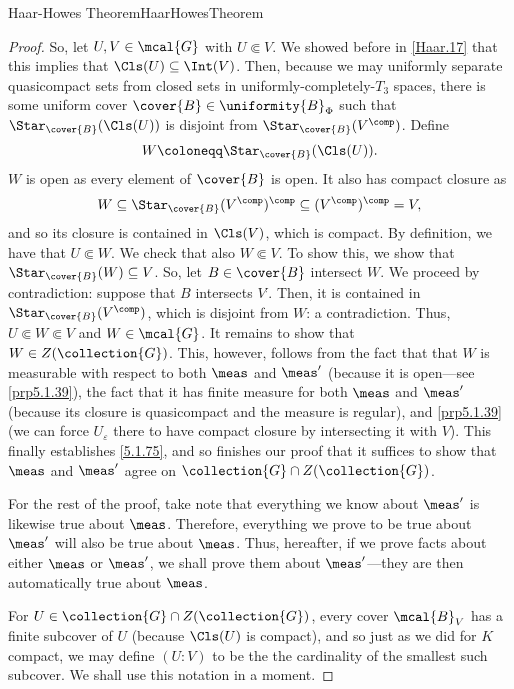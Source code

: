 \begin{thm}{Haar-Howes Theorem}{HaarHowesTheorem}
\begin{proof}
So, let $U,V\in \mcal{G}$ with $U\Subset V$.  We showed before in \cref{Haar.17} that this implies that $\Cls (U)\subseteq \Int (V)$.  Then, because we may uniformly separate quasicompact sets from closed sets in uniformly-completely-$T_3$ spaces, there is some uniform cover $\cover{B}\in \uniformity{B}_{\Phi}$ such that $\Star _{\cover{B}}(\Cls (U))$ is disjoint from $\Star _{\cover{B}}(V^{\comp})$.  Define
\begin{equation}
W\coloneqq \Star _{\cover{B}}(\Cls (U)).
\end{equation}
$W$ is open as every element of $\cover{B}$ is open.  It also has compact closure as
\begin{equation}
W\subseteq \Star _{\cover{B}}(V^{\comp})^{\comp}\subseteq (V^{\comp})^{\comp}=V,
\end{equation}
and so its closure is contained in $\Cls (V)$, which is compact.  By definition, we have that $U\Subset W$.  We check that also $W\Subset V$.  To show this, we show that $\Star _{\cover{B}}(W)\subseteq V$.  So, let $B\in \cover{B}$ intersect $W$.  We proceed by contradiction:  suppose that $B$ intersects $V^{\comp}$.  Then, it is contained in $\Star _{\cover{B}}(V^{\comp})$, which is disjoint from $W$:  a contradiction.  Thus, $U\Subset W\Subset V$ and $W\in \mcal{G}$.  It remains to show that $W\in Z(\collection{G})$.  This, however, follows from the fact that that $W$ is measurable with respect to both $\meas$ and $\meas '$ (because it is open---see \cref{prp5.1.39}), the fact that it has finite measure for both $\meas$ and $\meas '$ (because its closure is quasicompact and the measure is regular), and \cref{prp5.1.39} (we can force $U_{\varepsilon}$ there to have compact closure by intersecting it with $V$).  This finally establishes \eqref{5.1.75}, and so finishes our proof that it suffices to show that $\meas$ and $\meas '$ agree on $\collection{G}\cap Z(\collection{G})$.

For the rest of the proof, take note that everything we know about $\meas '$ is likewise true about $\meas$.  Therefore, everything we prove to be true about $\meas '$ will also be true about $\meas$.  Thus, hereafter, if we prove facts about either $\meas$ or $\meas '$, we shall prove them about $\meas '$---they are then automatically true about $\meas$.

For $U\in \collection{G}\cap Z(\collection{G})$, every cover $\mcal{B}_V$ has a finite subcover of $U$ (because $\Cls (U)$ is compact), and so just as we did for $K$ compact, we may define $(U:V)$ to be the the cardinality of the smallest such subcover.  We shall use this notation in a moment.


\end{proof}
\end{thm}
